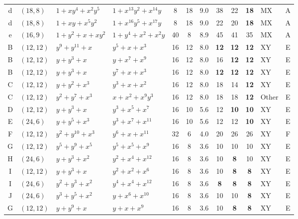 \begin{table}[t]
\begin{tabular*}{\textwidth}{@{\extracolsep{\fill}}clllcccccclc}
d & $(18,8)$ & $1{+}xy^{4}{+}x^{2}y^{5}$ & $1{+}x^{13}y^{2}{+}x^{14}y$ & 8 & 18 & 9.0 & 38 & 22 & \textbf{18} & MX & A \\
d & $(18,8)$ & $1{+}xy{+}x^{5}y^{2}$ & $1{+}x^{16}y^{5}{+}x^{17}y$ & 8 & 18 & 9.0 & 22 & 20 & \textbf{18} & MX & A \\
e & $(16,9)$ & $1{+}y^{2}{+}x{+}xy^{2}$ & $1{+}y^{4}{+}x^{2}{+}x^{2}y$ & 40 & 8 & 8.9 & 45 & 41 & 35 & MX & A \\
B & $(12,12)$ & $y^{9}{+}y^{11}{+}x$ & $y^{5}{+}x{+}x^{3}$ & 16 & 12 & 8.0 & \textbf{12} & \textbf{12} & \textbf{12} & XY & E \\
B & $(12,12)$ & $y{+}y^{3}{+}x$ & $y{+}x^{7}{+}x^{9}$ & 16 & 12 & 8.0 & 16 & \textbf{12} & \textbf{12} & XY & E \\
B & $(12,12)$ & $y{+}y^{3}{+}x$ & $y^{7}{+}x{+}x^{3}$ & 16 & 12 & 8.0 & \textbf{12} & \textbf{12} & \textbf{12} & XY & E \\
C & $(12,12)$ & $y{+}y^{2}{+}x^{3}$ & $y^{3}{+}x{+}x^{2}$ & 16 & 12 & 8.0 & 18 & 14 & \textbf{12} & XY & E \\
C & $(12,12)$ & $y^{2}{+}y^{7}{+}x^{3}$ & $x{+}x^{2}{+}x^{9}y^{3}$ & 16 & 12 & 8.0 & 18 & 18 & \textbf{12} & Other & E \\
D & $(12,12)$ & $y{+}y^{3}{+}x$ & $y^{3}{+}x^{5}{+}x^{7}$ & 16 & 10 & 5.6 & 12 & \textbf{10} & \textbf{10} & XY & E \\
E & $(24,6)$ & $y{+}y^{5}{+}x^{3}$ & $y^{3}{+}x^{7}{+}x^{11}$ & 16 & 10 & 5.6 & 12 & 12 & \textbf{10} & XY & E \\
F & $(12,12)$ & $y^{2}{+}y^{10}{+}x^{3}$ & $y^{6}{+}x{+}x^{11}$ & 32 & 6 & 4.0 & 20 & 26 & 26 & XY & F \\
G & $(12,12)$ & $y^{5}{+}y^{9}{+}x^{5}$ & $y^{5}{+}x^{5}{+}x^{9}$ & 16 & 8 & 3.6 & 10 & 10 & 10 & XY & E \\
H & $(24,6)$ & $y{+}y^{3}{+}x^{2}$ & $y^{2}{+}x^{4}{+}x^{12}$ & 16 & 8 & 3.6 & 10 & \textbf{8} & 10 & XY & E \\
I & $(12,12)$ & $y{+}y^{3}{+}x$ & $y^{2}{+}x^{2}{+}x^{6}$ & 16 & 8 & 3.6 & 10 & \textbf{8} & \textbf{8} & XY & E \\
I & $(24,6)$ & $y^{2}{+}y^{3}{+}x^{2}$ & $y^{4}{+}x^{4}{+}x^{12}$ & 16 & 8 & 3.6 & \textbf{8} & \textbf{8} & \textbf{8} & XY & E \\
J & $(24,6)$ & $y^{3}{+}y^{5}{+}x^{2}$ & $y{+}x^{6}{+}x^{10}$ & 16 & 8 & 3.6 & 10 & 10 & \textbf{8} & XY & E \\
G & $(12,12)$ & $y{+}y^{9}{+}x$ & $y{+}x{+}x^{9}$ & 16 & 8 & 3.6 & 10 & \textbf{8} & \textbf{8} & XY & E \\

\end{tabular*}
\end{table}
